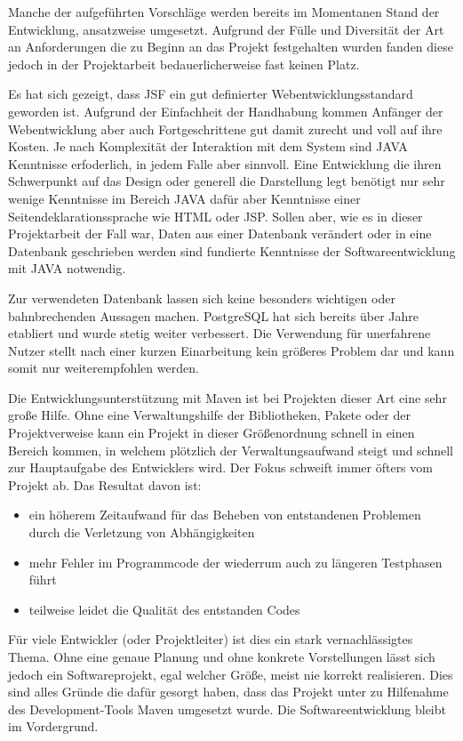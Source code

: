 \documentclass[12pt, twoside, a4paper, ngerman]{article}
\begin{document}
Manche der aufgeführten Vorschläge werden bereits im Momentanen Stand der Entwicklung, ansatzweise umgesetzt. 
Aufgrund der Fülle und Diversität der Art an Anforderungen die zu Beginn an das Projekt festgehalten wurden fanden diese jedoch in der Projektarbeit bedauerlicherweise fast keinen Platz.

Es hat sich gezeigt, dass \ac{JSF} ein gut definierter Webentwicklungsstandard geworden ist.
Aufgrund der Einfachheit der Handhabung kommen Anfänger der Webentwicklung aber auch Fortgeschrittene gut damit zurecht und voll auf ihre Kosten.
Je nach Komplexität der Interaktion mit dem System sind JAVA Kenntnisse erfoderlich, in jedem Falle aber sinnvoll. 
Eine Entwicklung die ihren Schwerpunkt auf das Design oder generell die Darstellung legt benötigt nur sehr wenige Kenntnisse im Bereich JAVA dafür aber Kenntnisse einer Seitendeklarationssprache wie HTML oder JSP.
Sollen aber, wie es in dieser Projektarbeit der Fall war, Daten aus einer Datenbank verändert oder in eine Datenbank geschrieben werden sind fundierte Kenntnisse der Softwareentwicklung mit JAVA notwendig.

Zur verwendeten Datenbank lassen sich keine besonders wichtigen oder bahnbrechenden Aussagen machen. PostgreSQL hat sich bereits über Jahre etabliert und wurde stetig weiter verbessert. 
Die Verwendung für unerfahrene Nutzer stellt nach einer kurzen Einarbeitung kein größeres Problem dar und kann somit nur weiterempfohlen werden. 
 
Die Entwicklungsunterstützung mit Maven ist bei Projekten dieser Art eine sehr große Hilfe.
Ohne eine Verwaltungshilfe der Bibliotheken, Pakete oder der Projektverweise kann ein Projekt in dieser Größenordnung schnell in einen Bereich kommen, in welchem plötzlich der Verwaltungsaufwand steigt und schnell zur Hauptaufgabe des Entwicklers wird.
Der Fokus schweift immer öfters vom Projekt ab. Das Resultat davon ist:
\begin{itemize}
	\item ein höherem Zeitaufwand für das Beheben von entstandenen Problemen durch die Verletzung von Abhängigkeiten 
	\item mehr Fehler im Programmcode der wiederrum auch zu längeren Testphasen führt
	\item teilweise leidet die Qualität des entstanden Codes 
\end{itemize}
Für viele Entwickler (oder Projektleiter) ist dies ein stark vernachlässigtes Thema.
Ohne eine genaue Planung und ohne konkrete Vorstellungen lässt sich jedoch ein Softwareprojekt, egal welcher Größe, meist nie korrekt realisieren.  
Dies sind alles Gründe die dafür gesorgt haben, dass das Projekt unter zu Hilfenahme des Development-Tools Maven umgesetzt wurde.
Die Softwareentwicklung bleibt im Vordergrund.
\end{document}
